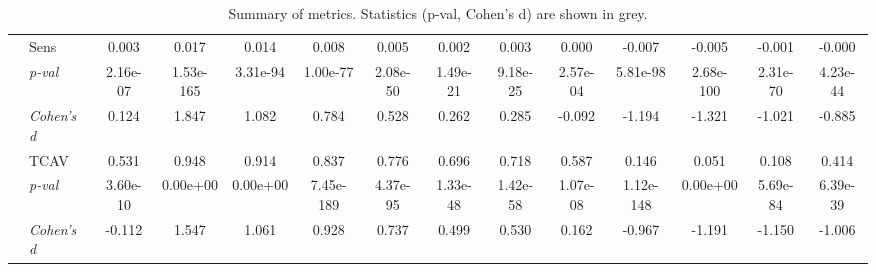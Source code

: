 \begin{table}[ht]
{\begin{tabular}{llcccccccccccc}
 \cmidrule(l){2-14}
 & Sens & 0.003 & 0.017 & 0.014 & 0.008 & 0.005 & 0.002 & 0.003 & 0.000 & -0.007 & -0.005 & -0.001 & -0.000 \\
 & \footnotesize\color{gray}\textit{p-val} & \footnotesize\color{gray}2.16e-07 & \footnotesize\color{gray}1.53e-165 & \footnotesize\color{gray}3.31e-94 & \footnotesize\color{gray}1.00e-77 & \footnotesize\color{gray}2.08e-50 & \footnotesize\color{gray}1.49e-21 & \footnotesize\color{gray}9.18e-25 & \footnotesize\color{gray}2.57e-04 & \footnotesize\color{gray}5.81e-98 & \footnotesize\color{gray}2.68e-100 & \footnotesize\color{gray}2.31e-70 & \footnotesize\color{gray}4.23e-44 \\
 & \footnotesize\color{gray}\textit{Cohen's d} & \footnotesize\color{gray}0.124 & \footnotesize\color{gray}1.847 & \footnotesize\color{gray}1.082 & \footnotesize\color{gray}0.784 & \footnotesize\color{gray}0.528 & \footnotesize\color{gray}0.262 & \footnotesize\color{gray}0.285 & \footnotesize\color{gray}-0.092 & \footnotesize\color{gray}-1.194 & \footnotesize\color{gray}-1.321 & \footnotesize\color{gray}-1.021 & \footnotesize\color{gray}-0.885 \\
 \cmidrule(l){2-14}
 & TCAV & 0.531 & 0.948 & 0.914 & 0.837 & 0.776 & 0.696 & 0.718 & 0.587 & 0.146 & 0.051 & 0.108 & 0.414 \\
 & \footnotesize\color{gray}\textit{p-val} & \footnotesize\color{gray}3.60e-10 & \footnotesize\color{gray}0.00e+00 & \footnotesize\color{gray}0.00e+00 & \footnotesize\color{gray}7.45e-189 & \footnotesize\color{gray}4.37e-95 & \footnotesize\color{gray}1.33e-48 & \footnotesize\color{gray}1.42e-58 & \footnotesize\color{gray}1.07e-08 & \footnotesize\color{gray}1.12e-148 & \footnotesize\color{gray}0.00e+00 & \footnotesize\color{gray}5.69e-84 & \footnotesize\color{gray}6.39e-39 \\
 & \footnotesize\color{gray}\textit{Cohen's d} & \footnotesize\color{gray}-0.112 & \footnotesize\color{gray}1.547 & \footnotesize\color{gray}1.061 & \footnotesize\color{gray}0.928 & \footnotesize\color{gray}0.737 & \footnotesize\color{gray}0.499 & \footnotesize\color{gray}0.530 & \footnotesize\color{gray}0.162 & \footnotesize\color{gray}-0.967 & \footnotesize\color{gray}-1.191 & \footnotesize\color{gray}-1.150 & \footnotesize\color{gray}-1.006 \\
\bottomrule
\end{tabular}%
}
\caption{Summary of metrics. Statistics (p-val, Cohen's d) are shown in grey.}
\label{tab:metrics_summary}
\end{table}